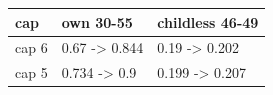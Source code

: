 \begingroup\small
\setlength{\tabcolsep}{3pt}
\renewcommand{\arraystretch}{1.04}
\begin{tabularx}{\linewidth}{XXX}
\toprule
cap & own 30-55 & childless 46-49 \\
\midrule
cap 6 & 0.67 -\textgreater{} 0.844 & 0.19 -\textgreater{} 0.202 \\
cap 5 & 0.734 -\textgreater{} 0.9 & 0.199 -\textgreater{} 0.207 \\
\bottomrule
\end{tabularx}
\endgroup
